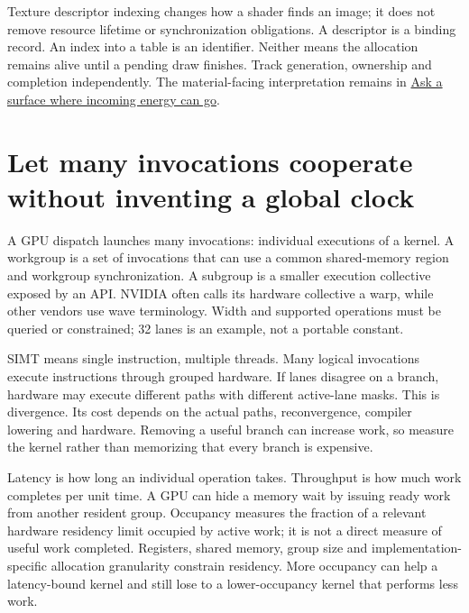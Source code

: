 Texture descriptor indexing changes how a shader finds an image; it does not remove resource lifetime or synchronization obligations. A descriptor is a binding record. An index into a table is an identifier. Neither means the allocation remains alive until a pending draw finishes. Track generation, ownership and completion independently. The material-facing interpretation remains in \hyperref[03-visual-computing-i-ch005-ask-a-surface-where-incoming-energy-can-go]{Ask a surface where incoming energy can go}.

\section{Let many invocations cooperate without inventing a global clock}\label{03-visual-computing-i-ch015-let-many-invocations-cooperate-without-inventing-a-global-clock}

\hypertarget{03-visual-computing-i-ch015-let-many-invocations-cooperate-without-inventing-a-global-clock}{}

A GPU dispatch launches many invocations: individual executions of a kernel. A workgroup is a set of invocations that can use a common shared-memory region and workgroup synchronization. A subgroup is a smaller execution collective exposed by an API. NVIDIA often calls its hardware collective a warp, while other vendors use wave terminology. Width and supported operations must be queried or constrained; 32 lanes is an example, not a portable constant.

SIMT means single instruction, multiple threads. Many logical invocations execute instructions through grouped hardware. If lanes disagree on a branch, hardware may execute different paths with different active-lane masks. This is divergence. Its cost depends on the actual paths, reconvergence, compiler lowering and hardware. Removing a useful branch can increase work, so measure the kernel rather than memorizing that every branch is expensive.

Latency is how long an individual operation takes. Throughput is how much work completes per unit time. A GPU can hide a memory wait by issuing ready work from another resident group. Occupancy measures the fraction of a relevant hardware residency limit occupied by active work; it is not a direct measure of useful work completed. Registers, shared memory, group size and implementation-specific allocation granularity constrain residency. More occupancy can help a latency-bound kernel and still lose to a lower-occupancy kernel that performs less work.

